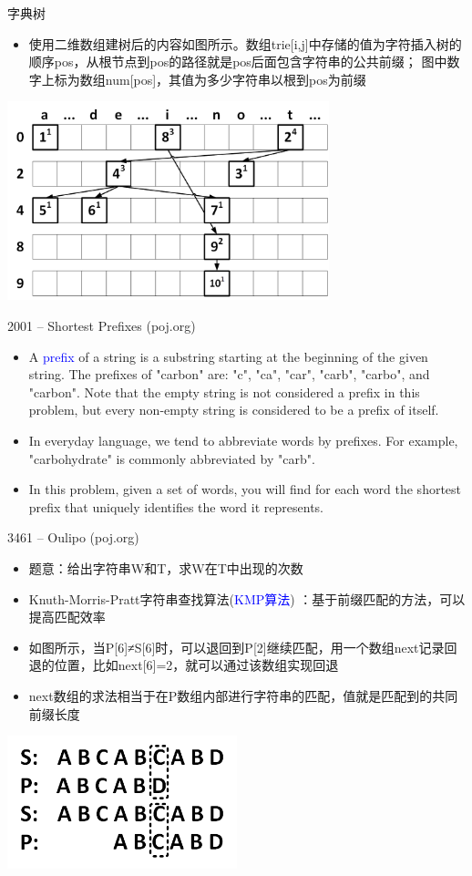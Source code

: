 \begin{frame}{字典树}
    \begin{itemize}
        \item 使用二维数组建树后的内容如图所示。数组trie[i,j]中存储的值为字符插入树的顺序pos，从根节点到pos的路径就是pos后面包含字符串的公共前缀； 图中数字上标为数组num[pos]，其值为多少字符串以根到pos为前缀
    \end{itemize}
    \includegraphics[width=0.7\textwidth,center]{fig/6-9.png}
\end{frame}
\begin{frame}{2001 -- Shortest Prefixes (poj.org)}
    \begin{itemize}
        \item A \textcolor{blue}{prefix} of a string is a substring starting at the beginning of the given string. The prefixes of "carbon" are: "c", "ca", "car", "carb", "carbo", and "carbon". Note that the empty string is not considered a prefix in this problem, but every non-empty string is considered to be a prefix of itself.
        \item In everyday language, we tend to abbreviate words by prefixes. For example, "carbohydrate" is commonly abbreviated by "carb".
        \item In this problem, given a set of words, you will find for each word the shortest prefix that uniquely identifies the word it represents.
    \end{itemize}
\end{frame}
\begin{frame}{3461 -- Oulipo (poj.org)}
    \begin{itemize}
        \item 题意：给出字符串W和T，求W在T中出现的次数
        \item Knuth-Morris-Pratt字符串查找算法(\textcolor{blue}{KMP算法}) ：基于前缀匹配的方法，可以提高匹配效率
        \item 如图所示，当P[6]≠S[6]时，可以退回到P[2]继续匹配，用一个数组next记录回退的位置，比如next[6]=2，就可以通过该数组实现回退
        \item next数组的求法相当于在P数组内部进行字符串的匹配，值就是匹配到的共同前缀长度
    \end{itemize}
    \includegraphics[width=0.5\textwidth,center]{fig/6-10.png}
\end{frame}
